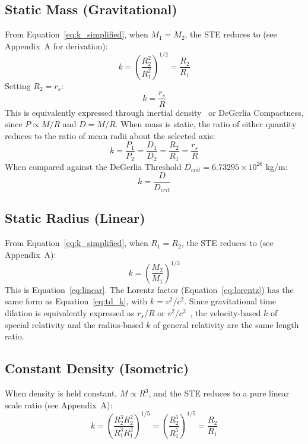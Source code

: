 \documentclass[a4paper,11pt]{article}
\begin{document}
\subsection{Static Mass (Gravitational)}
From Equation~\ref{eq:k_simplified}, when $M_1 = M_2$, the STE reduces to (see Appendix~A for derivation):
\begin{equation}
k = \left(\frac{R_2^2}{R_1^2}\right)^{1/2} = \frac{R_2}{R_1}
\end{equation}
Setting $R_2 = r_s$:
\begin{equation}
k = \frac{r_s}{R}
\end{equation}
This is equivalently expressed through inertial density~\cite{degerlia2025} or DeGerlia Compactness, since $P \propto M/R$ and $D = M/R$. When mass is static, the ratio of either quantity reduces to the ratio of mean radii about the selected axis:
\begin{equation}
k = \frac{P_1}{P_2} = \frac{D_1}{D_2} = \frac{R_2}{R_1} = \frac{r_s}{R}
\end{equation}
When compared against the DeGerlia Threshold $D_{crit} = 6.73295 \times 10^{26}$ kg/m:
\begin{equation}
k = \frac{D}{D_{crit}}
\end{equation}

\subsection{Static Radius (Linear)}
From Equation~\ref{eq:k_simplified}, when $R_1 = R_2$, the STE reduces to (see Appendix~A):
\begin{equation}
k = \left(\frac{M_2}{M_1}\right)^{1/3}
\end{equation}
This is Equation~\ref{eq:linear}. The Lorentz factor (Equation~\ref{eq:lorentz}) has the same form as Equation~\ref{eq:td_k}, with $k = v^2/c^2$. Since gravitational time dilation is equivalently expressed as $r_s/R$ or $v^2/c^2$~\cite{schwarzschild1916radius}, the velocity-based $k$ of special relativity and the radius-based $k$ of general relativity are the same length ratio.

\subsection{Constant Density (Isometric)}
When density is held constant, $M \propto R^3$, and the STE reduces to a pure linear scale ratio (see Appendix~A):
\begin{equation}
k = \left(\frac{R_2^3 R_2^2}{R_1^3 R_1^2}\right)^{1/5} = \left(\frac{R_2^5}{R_1^5}\right)^{1/5} = \frac{R_2}{R_1}
\end{equation}
\end{document}
